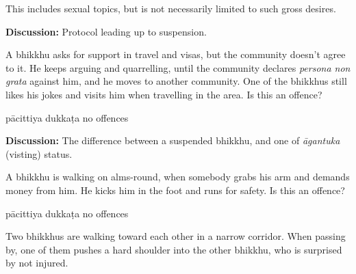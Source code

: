 \begin{exam}{\autoExamName}
\begin{problem}
\begin{solution}
    This includes sexual topics, but is not necessarily limited to such gross desires.
  \end{solution}

  \bigskip

  \textbf{Discussion:} Protocol leading up to suspension.

  \end{problem}

  \problemDivide

  \begin{problem}

    A bhikkhu asks for support in travel and visas, but the community doesn't
    agree to it. He keeps arguing and quarrelling, until the community declares
    \textit{persona non grata} against him, and he moves to another community.
    One of the bhikkhus still likes his jokes and visits him when travelling in
    the area. Is this an offence?

    \bigskip

    \begin{answers}{3}
      \bChoices
       pācittiya\eAns
       dukkaṭa\eAns
       no offences\eAns
      \eChoices
    \end{answers}

    \bigskip

    \textbf{Discussion:} The difference between a suspended bhikkhu, and one
    of \textit{āgantuka} (visting) status.

  \end{problem}

  \problemDivide

  \begin{problem}

    A bhikkhu is walking on alms-round, when somebody grabs his arm and demands money from him. 
    He kicks him in the foot and runs for safety. Is this an offence?

    \bigskip

    \begin{answers}{3}
      \bChoices
       pācittiya\eAns
       dukkaṭa\eAns
       no offences\eAns
      \eChoices
    \end{answers}

  \end{problem}

  \problemDivide

  \begin{problem}

    Two bhikkhus are walking toward each other in a narrow corridor. When
    passing by, one of them pushes a hard shoulder into the other bhikkhu, who
    is surprised by not injured.


\end{problem}
\end{exam}
